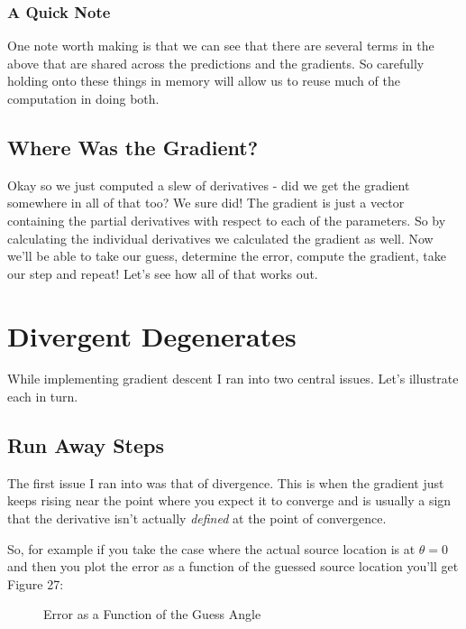 \documentclass[10pt,a4paper]{article}
\begin{document}
\subsubsection{A Quick Note}
One note worth making is that we can see that there are several terms in the above that are shared across the predictions and the gradients. So carefully holding onto these things in memory will allow us to reuse much of the computation in doing both.

\subsection{Where Was the Gradient?}
Okay so we just computed a slew of derivatives - did we get the gradient somewhere in all of that too? We sure did! The gradient is just a vector containing the partial derivatives with respect to each of the parameters. So by calculating the individual derivatives we calculated the gradient as well. Now we'll be able to take our guess, determine the error, compute the gradient, take our step and repeat! Let's see how all of that works out.

\newpage



\section{Divergent Degenerates}
While implementing gradient descent I ran into two central issues. Let's illustrate each in turn.

\subsection{Run Away Steps}
The first issue I ran into was that of divergence. This is when the gradient just keeps rising near the point where you expect it to converge and is usually a sign that the derivative isn't actually \textit{defined} at the point of convergence. 

So, for example if you take the case where the actual source location is at $\theta=0$ and then you plot the error as a function of the guessed source location you'll get Figure 27:

\begin{figure}[!htb]
\caption{\label{fig:my-label} Error as a Function of the Guess Angle}
\end{figure}
\end{document}
